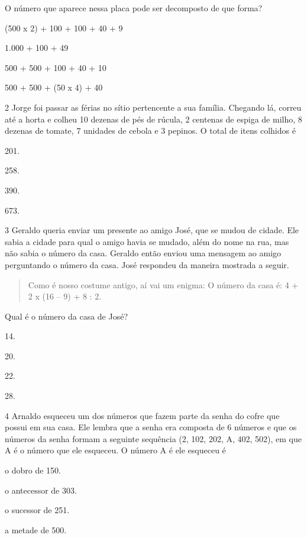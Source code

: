 O número que aparece nessa placa pode ser decomposto de que forma?

\begin{escolha}
\item (500 x 2) + 100 + 100 + 40 + 9
\item 1.000 + 100 + 49  
\item 500 + 500 + 100 + 40 + 10  
\item 500 + 500 + (50 x 4) + 40  
\end{escolha}


\num{2} Jorge foi passar as férias no sítio pertencente a sua família. Chegando lá,
correu até a horta e colheu 10 dezenas de pés de rúcula, 2 centenas de
espiga de milho, 8 dezenas de tomate, 7 unidades de cebola e 3 pepinos.
O total de itens colhidos é

\begin{escolha}
\item
  201.
\item
  258.
\item
  390.
\item
  673.
\end{escolha}


\num{3} Geraldo queria enviar um presente ao amigo José, que se mudou de cidade. Ele
sabia a cidade para qual o amigo havia se mudado, além do nome na rua, mas
não sabia o número da casa. Geraldo então enviou uma mensagem ao
amigo perguntando o número da casa. José respondeu da maneira mostrada a seguir.

\begin{quote}
Como é nosso costume antigo, aí vai um enigma:
O número da casa é: 4 + 2 x (16 -- 9) + 8 : 2.
\end{quote}

Qual é o número da casa de José?

\begin{escolha}
\item
  14.
\item
  20.
\item
  22.
\item
  28.
\end{escolha}


\num{4} Arnaldo esqueceu um dos números que fazem parte da senha do cofre que
possui em sua casa. Ele lembra que a senha era composta de 6 números e
que os números da senha formam a seguinte sequência (2, 102, 202,
A, 402, 502), em que A é o número que ele esqueceu. O número A é
ele esqueceu é

\begin{escolha}
\item
  o dobro de 150.
\item
  o antecessor de 303.
\item
  o sucessor de 251.
\item
  a metade de 500.
\end{escolha}


